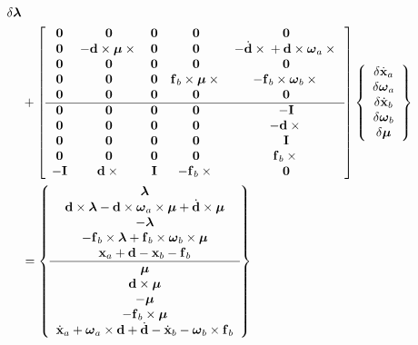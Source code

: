 \documentclass[10pt,dvips,fleqn,subeqn]{report}
\newcommand{\T}[1]{\bm{\mathbf{#1}}}
\begin{document}
\begin{align}
{{		\delta\T{\lambda}
	}} \nonumber \\
	&+ \sqbr{\matr{ccccc}{
		\T{0} & \T{0} & \T{0} & \T{0} & \T{0} \\ 	%
		\T{0} & -\T{d}\times\T{\mu}\times{} &
			\T{0} & \T{0} & 
			- \dot{\T{d}}\times{}
			+ \T{d}\times\T{\omega}_a\times{} \\	%
		\T{0} & \T{0} & \T{0} & \T{0} & \T{0} \\	%
		\T{0} & \T{0} & \T{0} & \T{f}_b\times\T{\mu}\times{} &
			-\T{f}_b\times\T{\omega}_b\times{} \\	%
		\T{0} & \T{0} & \T{0} & \T{0} & \T{0} \\	%
%
	\hline
		\T{0} & \T{0} & \T{0} & \T{0} & -\T{I} \\	%
		\T{0} & \T{0} &
			\T{0} & \T{0} & -\T{d}\times{} \\	%
		\T{0} & \T{0} & \T{0} & \T{0} & \T{I} \\	%
		\T{0} & \T{0} & \T{0} & \T{0} &
			\T{f}_b\times{} \\	%
		-\T{I} & \T{d}\times{} & \T{I} & -\T{f}_b\times{} &
			\T{0} 					%
	}} \cubr{\cvvect{
		\delta\dot{\T{x}}_a \\
		\delta\T{\omega}_a \\
		\delta\dot{\T{x}}_b \\
		\delta\T{\omega}_b \\
		\delta\T{\mu}
	}} \nonumber \\
	&= \cubr{\cvvect{
		\T{\lambda} \\
		\T{d}\times\T{\lambda}
			- \T{d}\times\T{\omega}_a\times\T{\mu}
			+ \dot{\T{d}}\times\T{\mu} \\
		-\T{\lambda} \\
		-\T{f}_b\times\T{\lambda}
			+ \T{f}_b\times\T{\omega}_b\times\T{\mu} \\
		\T{x}_a + \T{d} - \T{x}_b - \T{f}_b \\
%
		\hline
		\T{\mu} \\
		\T{d}\times\T{\mu} \\
		-\T{\mu} \\
		-\T{f}_b\times\T{\mu} \\
		\dot{\T{x}}_a + \T{\omega}_a\times\T{d} + \dot{\T{d}}
			- \dot{\T{x}}_b - \T{\omega}_b\times\T{f}_b
	}}
\end{align}
\end{document}
